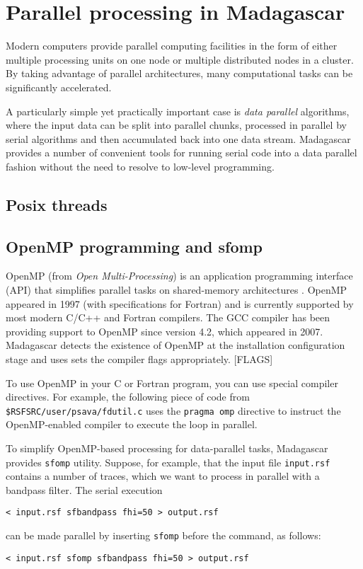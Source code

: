 \chapter{Parallel processing in Madagascar}

Modern computers provide parallel computing facilities in the form of
either multiple processing units on one node or multiple distributed
nodes in a cluster. By taking advantage of parallel architectures,
many computational tasks can be significantly accelerated.

A particularly simple yet practically important case is \emph{data
  parallel} algorithms, where the input data can be split into
parallel chunks, processed in parallel by serial algorithms and then
accumulated back into one data stream. Madagascar provides a number of
convenient tools for running serial code into a data parallel fashion
without the need to resolve to low-level programming.

\section{Posix threads}

\section{OpenMP programming and sfomp}

OpenMP (from \emph{Open Multi-Processing}) is an application
programming interface (API) that simplifies parallel tasks on
shared-memory architectures \cite[]{chandra,chapman}. OpenMP appeared
in 1997 (with specifications for Fortran) and is currently supported
by most modern C/C++ and Fortran compilers. The GCC compiler has been
providing support to OpenMP since version 4.2, which appeared in
2007. Madagascar detects the existence of OpenMP at the installation
configuration stage and uses sets the compiler flags appropriately. [FLAGS]

To use OpenMP in your C or Fortran program, you can use special
compiler directives. For example, the following piece of code from
\texttt{\$RSFSRC/user/psava/fdutil.c} uses the \texttt{pragma omp}
directive to instruct the OpenMP-enabled compiler to execute the loop
in parallel.

\lstset{language=c,numbers=left,numberstyle=\tiny,showstringspaces=false}


To simplify OpenMP-based processing for data-parallel tasks,
Madagascar provides \texttt{sfomp} utility. Suppose, for example, that
the input file \texttt{input.rsf} contains a number of traces, which
we want to process in parallel with a bandpass filter. The serial execution
\begin{verbatim}
< input.rsf sfbandpass fhi=50 > output.rsf
\end{verbatim}
can be made parallel by inserting \texttt{sfomp} before the command, as follows:
\begin{verbatim}
< input.rsf sfomp sfbandpass fhi=50 > output.rsf
\end{verbatim}

